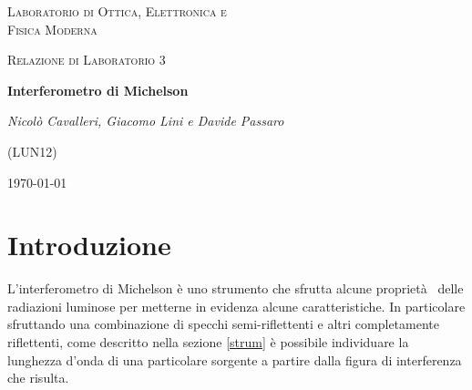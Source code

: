 \documentclass[a4paper,11pt]{article}
\begin{document}
	
	\begin{titlepage}
		\centering
		{\scshape\LARGE Laboratorio di Ottica, Elettronica e \\ Fisica Moderna \par}
		\vspace{1cm}
		{\scshape\Large Relazione di Laboratorio 3\par}
		\vspace{1.5cm}
		{\huge\bfseries Interferometro di Michelson\par}
		\vspace{2cm}
		
		{\Large\itshape Nicolò Cavalleri, Giacomo Lini e Davide Passaro
			
			(LUN12)}
		
		\vspace{5cm}
		\vfill
		
		\begin{abstract}
			Di seguito vengono riportate la procedura sperimentale, e l'analisi dei dati raccolti relativi a un esperimento compiuto con un Interferometro di Michelson. In particolare tramite il calcolo delle frange di interferenza dell'immagine prodotta viene determinata la lunghezza d'onda della luce emessa da un laser monocromatico. Altre grandezze fisiche rilevanti che questo apparato consente di mettere in evidenza sono l'indice di rifrazione dell'aria, la lunghezza dei pacchetti d'onda emessi da luce non monocromatica, e la differenza di lunghezza d'onda tra sorgenti differenti, nello specifico l'analisi è relativa al doppietto di sodio. Per ognuna di queste grandezze vengono riportate procedure sperimentali e risultati comprensivi di errore.
		\end{abstract}
		
		
		\vfill
		{\large \today\par}
		
	\end{titlepage}
	
	\newpage
	
	\section{Introduzione}
	L'interferometro di Michelson è uno strumento che sfrutta alcune proprietà  delle radiazioni luminose per metterne in evidenza alcune caratteristiche. In particolare sfruttando una combinazione di specchi semi-riflettenti e altri completamente riflettenti, come descritto nella sezione \ref{strum} è possibile individuare la lunghezza d'onda di una particolare sorgente a partire dalla figura di interferenza che risulta.	
	
\end{document}
